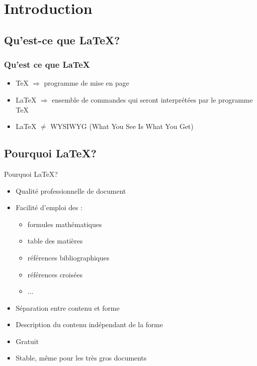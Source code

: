 \documentclass[10pt,svgnames,usenames,table]{beamer} %
\begin{document}

\section{Introduction}
\subsection{Qu'est-ce que \LaTeX{}?}
\begin{frame}
\frametitle{Qu'est ce que \LaTeX}

\begin{itemize}
\item \TeX{} $ \Rightarrow$ programme de mise en page
\vspace{0.5cm}
\item \LaTeX{} $ \Rightarrow$ ensemble de commandes qui seront
 interprétées par le programme \TeX
 \vspace{0.5cm}
\item \LaTeX{} $ \neq$ WYSIWYG (What You See Is What You Get)
\end{itemize}

\end{frame}

\subsection{Pourquoi \LaTeX{}?}
\begin{frame}{Pourquoi \LaTeX{}?}

  \begin{itemize}
  	\item Qualité professionnelle de document
	\item Facilité d'emploi des :
	\begin{itemize}
		\item formules mathématiques
		\item table des matières
		\item références bibliographiques
		\item références croisées
		\item ...
	\end{itemize}
	\item Séparation entre contenu et forme
	\item Description du contenu indépendant de la forme
	\item Gratuit
	\item Stable, même pour les très gros documents
  \end{itemize}
\end{frame}
\end{document}
